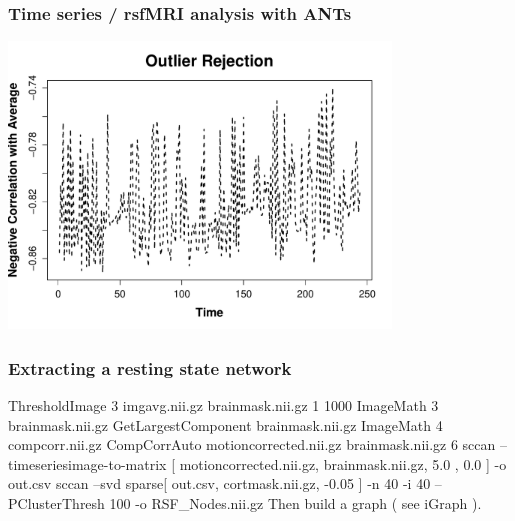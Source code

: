 \documentclass[18pt]{beamer}
\begin{document}
\begin{frame}
\frametitle{Time series / rsfMRI analysis with ANTs}
\includegraphics[width=4in]{../figures/rsfmriplot2.pdf}
\end{frame}

\begin{frame}
\frametitle{Extracting a resting state network}
   ThresholdImage 3 imgavg.nii.gz brainmask.nii.gz 1  1000 
   \newline
   \newline
   ImageMath 3 brainmask.nii.gz GetLargestComponent brainmask.nii.gz 
   \newline
   \newline
   ImageMath 4 compcorr.nii.gz CompCorrAuto motioncorrected.nii.gz   brainmask.nii.gz 6
   \newline
   \newline
   sccan  --timeseriesimage-to-matrix [ motioncorrected.nii.gz,   brainmask.nii.gz, 5.0 , 0.0 ] -o out.csv 
   \newline
   \newline
   sccan  --svd sparse[ out.csv, cortmask.nii.gz, -0.05 ] -n 40 -i 40  --PClusterThresh 100  -o RSF\_Nodes.nii.gz
   \newline
   \newline
   Then build a graph ( see iGraph ).
\end{frame}
\end{document}

